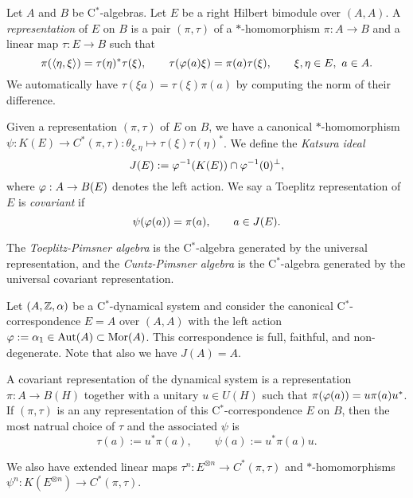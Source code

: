 \documentclass{../../large}
\begin{document}
\begin{prb}
Let $A$ and $B$ be C$^*$-algebras.
Let $E$ be a right Hilbert bimodule over $(A,A)$.
A \emph{representation} of $E$ on $B$ is a pair $(\pi,\tau)$ of a $*$-homomorphism $\pi:A\to B$ and a linear map $\tau:E\to B$ such that
\[\pi(\langle\eta,\xi\rangle)=\tau(\eta)^*\tau(\xi),\qquad\tau(\varphi(a)\xi)=\pi(a)\tau(\xi),\qquad\xi,\eta\in E,\ a\in A.\]
We automatically have $\tau(\xi a)=\tau(\xi)\pi(a)$ by computing the norm of their difference.

Given a representation $(\pi,\tau)$ of $E$ on $B$, we have a canonical $*$-homomorphism $\psi:K(E)\to C^*(\pi,\tau):\theta_{\xi,\eta}\mapsto\tau(\xi)\tau(\eta)^*$.
We define the \emph{Katsura ideal}
\[J(E):=\varphi^{-1}(K(E))\cap\varphi^{-1}(0)^\perp,\]
where $\varphi:A\to B(E)$ denotes the left action.
We say a Toeplitz representation of $E$ is \emph{covariant} if
\[\psi(\varphi(a))=\pi(a),\qquad a\in J(E).\]

The \emph{Toeplitz-Pimsner algebra} is the C$^*$-algebra generated by the universal representation, and the \emph{Cuntz-Pimsner algebra} is the C$^*$-algebra generated by the universal covariant representation.
\begin{parts}
\item
Let $(A,\mathbb{Z},\alpha)$ be a C$^*$-dynamical system and consider the canonical C$^*$-correspondence $E=A$ over $(A,A)$ with the left action $\varphi:=\alpha_1\in\operatorname{Aut}(A)\subset\operatorname{Mor}(A)$.
This correspondence is full, faithful, and non-degenerate.
Note that also we have $J(A)=A$.

A covariant representation of the dynamical system is a representation $\pi:A\to B(H)$ together with a unitary $u\in U(H)$ such that $\pi(\varphi(a))=u\pi(a)u^*$.
If $(\pi,\tau)$ is an any representation of this C$^*$-correspondence $E$ on $B$, then the most natrual choice of $\tau$ and the associated $\psi$ is
\[\tau(a):=u^*\pi(a),\qquad\psi(a):=u^*\pi(a)u.\]


\end{parts}
\end{prb}

\begin{pf}

We also have extended linear maps $\tau^n:E^{\otimes n}\to C^*(\pi,\tau)$ and $*$-homomorphisms $\psi^n:K(E^{\otimes n})\to C^*(\pi,\tau)$.
\end{pf}

\begin{prb}
\end{prb}
\end{document}
